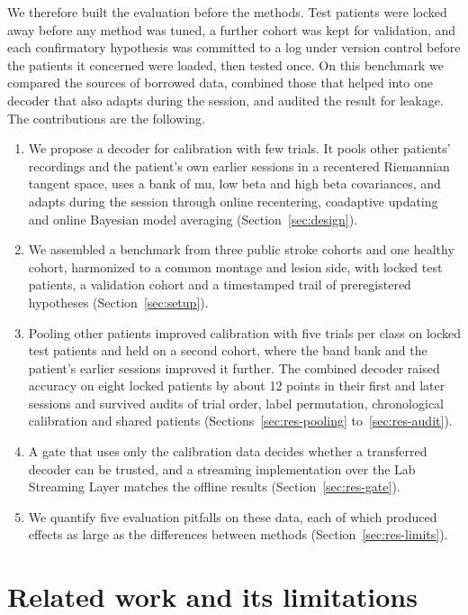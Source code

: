 \documentclass{ieeeaccess}
\begin{document}
We therefore built the evaluation before the methods. Test patients were locked away before any method was tuned, a further cohort was kept for validation, and each confirmatory hypothesis was committed to a log under version control before the patients it concerned were loaded, then tested once. On this benchmark we compared the sources of borrowed data, combined those that helped into one decoder that also adapts during the session, and audited the result for leakage. The contributions are the following.
\begin{enumerate}
\item We propose a decoder for calibration with few trials. It pools other patients' recordings and the patient's own earlier sessions in a recentered Riemannian tangent space, uses a bank of mu, low beta and high beta covariances, and adapts during the session through online recentering, coadaptive updating and online Bayesian model averaging (Section~\ref{sec:design}).
\item We assembled a benchmark from three public stroke cohorts and one healthy cohort, harmonized to a common montage and lesion side, with locked test patients, a validation cohort and a timestamped trail of preregistered hypotheses (Section~\ref{sec:setup}).
\item Pooling other patients improved calibration with five trials per class on locked test patients and held on a second cohort, where the band bank and the patient's earlier sessions improved it further. The combined decoder raised accuracy on eight locked patients by about 12 points in their first and later sessions and survived audits of trial order, label permutation, chronological calibration and shared patients (Sections~\ref{sec:res-pooling} to~\ref{sec:res-audit}).
\item A gate that uses only the calibration data decides whether a transferred decoder can be trusted, and a streaming implementation over the Lab Streaming Layer matches the offline results (Section~\ref{sec:res-gate}).
\item We quantify five evaluation pitfalls on these data, each of which produced effects as large as the differences between methods (Section~\ref{sec:res-limits}).
\end{enumerate}

\section{Related work and its limitations}\label{sec:related}
\end{document}
